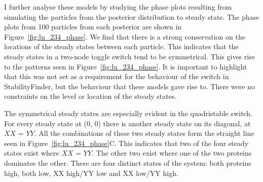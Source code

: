 


I further analyse these models by studying the phase plots resulting from simulating the particles from the posterior distribution to steady state. The phase plots from 100 particles from each posterior are shown in Figure~\ref{fig:lu_234_phase}. We find that there is a strong conservation on the locations of the steady states between each particle. This indicates that the steady states in a two-node toggle switch tend to be symmetrical. This gives rise to the patterns seen in Figure~\ref{fig:lu_234_phase}. It is important to highlight that this was not set as a requirement for the behaviour of the switch in StabilityFinder, but the behaviour that these models gave rise to. There were no constraints on the level or location of the steady states. 

The symmetrical steady states are especially evident in the quadristable switch.  For every steady state at (0, 0) there is another steady state on its diagonal, at $XX$ = $YY$. All the combinations of these two steady states form the straight line seen in Figure~\ref{fig:lu_234_phase}C. This indicates that two of the four steady states exist where $XX$ = $YY$. The other two exist where one of the two proteins dominates the other.  There are four distinct states of the system: both proteins high, both low, XX high/YY low and XX low/YY high. 


